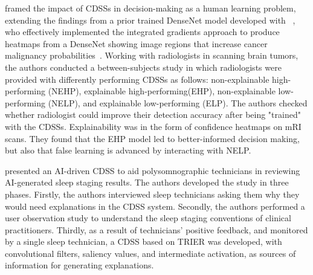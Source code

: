 \cite{ellenrieder2023promoting} framed the impact of CDSSs in decision-making as a human learning problem, extending the findings from a prior trained DenseNet model developed with ~\cite{pumplun2023bringing}, who effectively implemented the integrated gradients approach to produce heatmaps from a DenseNet showing image regions that increase cancer malignancy probabilities~\cite{sundararajan2017axiomatic}. 
Working with radiologists in scanning brain tumors, the authors conducted a between-subjects study in which radiologists were provided with differently performing CDSSs as follows: non-explainable high-performing (NEHP), explainable high-performing(EHP), non-explainable low-performing (NELP), and explainable low-performing (ELP). The authors checked whether radiologist could improve their detection accuracy after being "trained" with the CDSSs. Explainability was in the form of confidence heatmaps on mRI scans.  They found that the EHP model led to better-informed decision making, but also that false learning is advanced by interacting with NELP. 






\cite{hwang2022clinical} presented an AI-driven CDSS to aid polysomnographic technicians in reviewing AI-generated sleep staging results. The authors developed the study in three phases. Firstly, the authors interviewed sleep technicians asking them why they would need explanations in the CDSS system. Secondly, the authors performed a user observation study to understand the sleep staging conventions of clinical practitioners. Thirdly, as a result of technicians' positive feedback, and monitored by a single sleep technician, a CDSS based on TRIER was developed, with convolutional filters, saliency values, and intermediate activation, as sources of information for generating explanations. 


